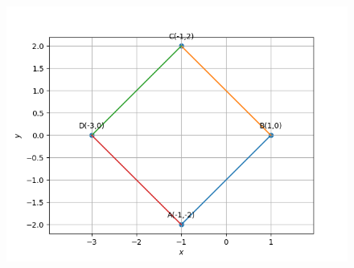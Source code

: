 \documentclass[12pt]{article}
\begin{document}
\begin{enumerate}
\begin{figure}[!h]
	\begin{center} 
	    \includegraphics[width=\columnwidth]{figs/quad1}
	\end{center}
\caption{}
\label{fig:Fig1}
\end{figure}


\end{enumerate}
\end{document}
